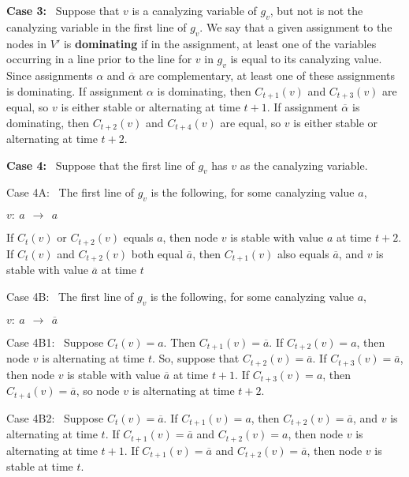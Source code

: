 \noindent
\textbf{Case 3:}~ Suppose that $v$ is a canalyzing variable of $g_v$, 
but not is not the canalyzing variable in the first line of $g_v$.
We say that a given assignment to the nodes in $V'$ is {\bf dominating} 
if in the assignment, at least one of the variables occurring in a line prior to the line for $v$ in $g_v$
is equal to its canalyzing value.
Since assignments $\alpha$  and $\overline{\alpha}$ are complementary,
at least one of these assignments is dominating.
If assignment $\alpha$  is dominating, then $C_{t+1}(v)$ and $C_{t+3}(v)$ are equal,
so $v$ is either stable or alternating at time $t+1$.
If assignment $\overline{\alpha}$  is dominating, then $C_{t+2}(v)$ and $C_{t+4}(v)$ are equal,
so $v$ is either stable or alternating at time $t+2$.

\noindent
\textbf{Case 4:}~ Suppose that the first line of $g_v$ has $v$ as the canalyzing variable.

\begin{description}
\item{\textsf{Case 4A:}}~ The first line of $g_v$ is the following, for some canalyzing value $a$,

\noindent
\hspace*{1.1in} $v:~ a ~~\longrightarrow~~ a$


If $C_t(v)$ or $C_{t+2}(v)$ equals $a$,
then node $v$ is stable with value $a$ at time $t+2$.
If  $C_t(v)$  and $C_{t+2}(v)$ both equal $\overline{a}$,
then $C_{t+1}(v)$ also equals $\overline{a}$, and $v$ is stable with value $\overline{a}$ at time $t$

\item{\textsf{Case 4B:}}~ The first line of $g_v$ is the following, for some canalyzing value $a$,

\noindent
\hspace*{1.1in} $v:~ a ~~\longrightarrow~~ \overline{a}$


\begin{description}
\item{\textsf{Case 4B1:}}~ Suppose $C_t(v) = a$. 
Then $C_{t+1}(v) =  \overline{a}$. 
If $C_{t+2}(v) = a$, then node $v$ is alternating at time $t$.
So, suppose that $C_{t+2}(v) = \overline{a}$.
If $C_{t+3}(v) = \overline{a}$,
then node $v$ is stable with value $\overline{a}$ at time $t+1$.
If $C_{t+3}(v) = a$, then $C_{t+4}(v) = \overline{a}$,
so node $v$ is alternating at time $t+2$.

\item{\textsf{Case 4B2:}}~ Suppose $C_t(v) = \overline{a}$.
If $C_{t+1}(v) = a$, then $C_{t+2}(v) = \overline{a}$,
and $v$ is alternating at time $t$.
If $C_{t+1}(v) = \overline{a}$ and $C_{t+2}(v) = a$, then node $v$ is alternating at time $t+1$.
If $C_{t+1}(v) = \overline{a}$ and $C_{t+2}(v) =  \overline{a}$, then node $v$ is stable at time $t$.
\end{description} %

\end{description}
\QED

